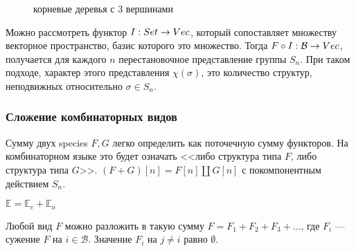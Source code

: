 \begin{figure}
\begin{center}
\end{center}
\caption{корневые деревья с 3 вершинами}
\label{pic:3-rooted-trees}
\end{figure}

Можно рассмотреть функтор $I:Set \rightarrow Vec$, который сопоставляет множеству
векторное пространство, базис которого это множество.
Тогда $F \circ I: \mathcal B \rightarrow Vec$, получается для каждого $n$
перестановочное представление группы $S_n$. При таком подходе, характер этого
представления $\chi(\sigma)$, это количество структур, неподвижных относительно $\sigma \in S_n$.

\subsubsection{Сложение комбинаторных видов}
Сумму двух species $F, G$ легко определить как поточечную сумму функторов.
На комбинаторном языке это будет означать <<либо структура типа $F$, либо
структура типа $G$>>. $(F + G)[n] = F[n] \coprod G[n]$ с покомпонентным
действием $S_n$.
\begin{example}
$\mathbb E = \mathbb E_e + \mathbb E_o$
\end{example}
\begin{example}
Любой вид $F$ можно разложить в такую сумму $F =
F_{1} + F_{2} + F_{3} + \dots$, где $F_{i}$ --- сужение $F$ на $i \in \mathcal
B$. Значение $F_{i}$ на $j \neq i$ равно $\emptyset$.
\end{example}

